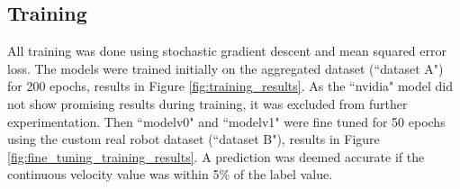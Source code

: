 \documentclass{article}
\begin{document}
\subsection{Training}
All training was done using stochastic gradient descent and mean squared error loss. The models were trained initially on the aggregated dataset (``dataset A") for 200 epochs, results in Figure \ref{fig:training_results}. As the ``nvidia" model did not show promising results during training, it was excluded from further experimentation. Then ``modelv0" and ``modelv1" were fine tuned for 50 epochs using the custom real robot dataset (``dataset B"), results in Figure \ref{fig:fine_tuning_training_results}. A prediction was deemed accurate if the continuous velocity value was within 5\% of the label value.

\begin{figure}
  \centering
  \hfill
  \hfill
  \par
  \hfill

\end{figure}
\end{document}
